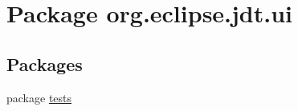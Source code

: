 \hypertarget{namespaceorg_1_1eclipse_1_1jdt_1_1ui}{
\section{Package org.eclipse.jdt.ui}
\label{namespaceorg_1_1eclipse_1_1jdt_1_1ui}
}
\subsection*{Packages}
\begin{DoxyCompactItemize}
\item 
package \hyperlink{namespaceorg_1_1eclipse_1_1jdt_1_1ui_1_1tests}{tests}
\end{DoxyCompactItemize}
